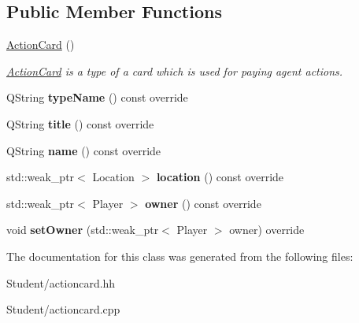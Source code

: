 \subsection*{Public Member Functions}
\begin{DoxyCompactItemize}
\item 
\hypertarget{class_interface_1_1_action_card_a93b56dc66e5e3dc8c8ac723a44f98a09}{\hyperlink{class_interface_1_1_action_card_a93b56dc66e5e3dc8c8ac723a44f98a09}{Action\-Card} ()}\label{class_interface_1_1_action_card_a93b56dc66e5e3dc8c8ac723a44f98a09}

\begin{DoxyCompactList}\small\item\em \hyperlink{class_interface_1_1_action_card}{Action\-Card} is a type of a card which is used for paying agent actions. \end{DoxyCompactList}\item 
\hypertarget{class_interface_1_1_action_card_adbfe39f1607197194405c2c243b4b8dc}{Q\-String {\bfseries type\-Name} () const override}\label{class_interface_1_1_action_card_adbfe39f1607197194405c2c243b4b8dc}

\item 
\hypertarget{class_interface_1_1_action_card_ab14974115b866e594f15730215390c9d}{Q\-String {\bfseries title} () const override}\label{class_interface_1_1_action_card_ab14974115b866e594f15730215390c9d}

\item 
\hypertarget{class_interface_1_1_action_card_ae24a8f256ffa1147167020632fa67607}{Q\-String {\bfseries name} () const override}\label{class_interface_1_1_action_card_ae24a8f256ffa1147167020632fa67607}

\item 
\hypertarget{class_interface_1_1_action_card_afa3ab5baaa24b44a0cdaea7e8897ba4b}{std\-::weak\-\_\-ptr$<$ Location $>$ {\bfseries location} () const override}\label{class_interface_1_1_action_card_afa3ab5baaa24b44a0cdaea7e8897ba4b}

\item 
\hypertarget{class_interface_1_1_action_card_a8c0e136196ee63ae16d33eff2f9eec4d}{std\-::weak\-\_\-ptr$<$ Player $>$ {\bfseries owner} () const override}\label{class_interface_1_1_action_card_a8c0e136196ee63ae16d33eff2f9eec4d}

\item 
\hypertarget{class_interface_1_1_action_card_af2526ed23df49787d7a6de9f5ed0c1df}{void {\bfseries set\-Owner} (std\-::weak\-\_\-ptr$<$ Player $>$ owner) override}\label{class_interface_1_1_action_card_af2526ed23df49787d7a6de9f5ed0c1df}

\end{DoxyCompactItemize}


The documentation for this class was generated from the following files\-:\begin{DoxyCompactItemize}
\item 
Student/actioncard.\-hh\item 
Student/actioncard.\-cpp\end{DoxyCompactItemize}
